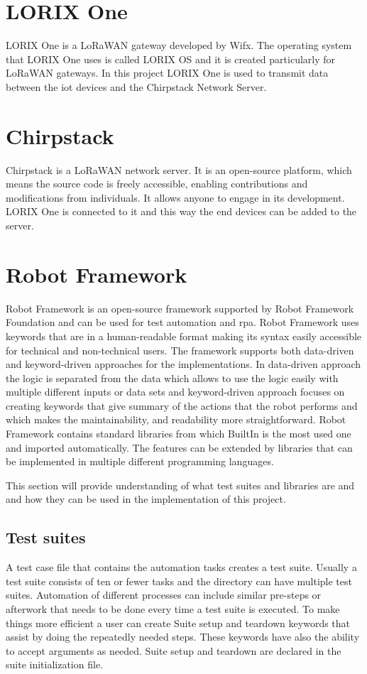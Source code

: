 \section{LORIX One}
LORIX One is a LoRaWAN gateway developed by Wifx.
The operating system that LORIX One uses is called LORIX OS and it is created particularly for LoRaWAN gateways.
In this project LORIX One is used to transmit data between the \gls{iot} devices and the Chirpstack Network Server.

\section{Chirpstack}
Chirpstack is a LoRaWAN network server. It is an open-source platform, which means the source code is freely accessible, enabling contributions and modifications from individuals. It allows anyone to engage in its development. LORIX One is connected to it and this way the end devices can be added to the server.

\section{Robot Framework}
Robot Framework is an open-source framework supported by Robot Framework Foundation and can be used for test automation and \gls{rpa}.
Robot Framework uses keywords that are in a human-readable format making its syntax easily accessible for technical and non-technical users.
The framework supports both data-driven and keyword-driven approaches for the implementations.
In data-driven approach the logic is separated from the data which allows to use the logic easily with multiple different inputs or data sets and keyword-driven approach focuses on creating keywords that give summary of the actions that the robot performs and which makes the maintainability, and readability more straightforward.
Robot Framework contains standard libraries from which BuiltIn is the most used one and imported automatically.
The features can be extended by libraries that can be implemented in multiple different programming languages.

This section will provide understanding of what test suites and libraries are and and how they can be used in the implementation of this project.

\subsection{Test suites}
A test case file that contains the automation tasks creates a test suite. Usually a test suite consists of ten or fewer tasks and the directory can have multiple test suites.
Automation of different processes can include similar pre-steps or afterwork that needs to be done every time a test suite is executed.
To make things more efficient a user can create Suite setup and teardown keywords that assist by doing the repeatedly needed steps.
These keywords have also the ability to accept arguments as needed.
Suite setup and teardown are declared in the suite initialization file.

